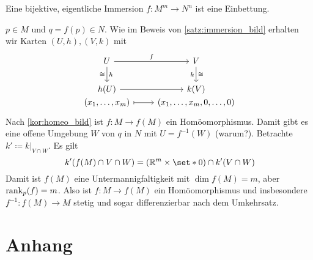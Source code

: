 \begin{satz}
	Eine bijektive, eigentliche Immersion $f \colon M^m \to N^n$ ist eine Einbettung.
\end{satz}
\begin{beweis}
	$p \in M$ und $q =f(p) \in N$.
	Wie im Beweis von \cref{satz:immersion_bild} erhalten wir Karten $(U,h), (V,k)$ mit
	\[
		\begin{tikzcd}
			U \rar["f"] \dar["h","\cong"'] & V \dar["\cong","k"'] \\
			h(U) \rar & k(V) \\[-2em]
			(x_1, \ldots ,x_m) \rar[mapsto] & (x_1, \ldots ,x_m, 0, \ldots ,0)
		\end{tikzcd}
	\]
	Nach \cref{kor:homeo_bild} ist $f \colon M \to f(M)$ ein Homöomorphismus.
	Damit gibt es eine offene Umgebung $W$ von $q$ in $N$ mit $U =f^{-1}(W)$ (warum?).
	Betrachte $k' \coloneqq k|_{V \cap W}$.
	Es gilt 
	\[
		k'(f(M) \cap V \cap W) = (\mathbb{R}^m \times \set*{0}) \cap k'(V \cap W)
	\]
	Damit ist $f(M)$ eine Untermannigfaltigkeit mit $\dim f(M) =m$, aber $\operatorname{rank}_p(f)=m$.
	Also ist $f \colon M \to f(M)$ ein Homöomorphismus und insbesondere $f^{-1} \colon f(M) \to M$ stetig und sogar differenzierbar nach dem Umkehrsatz. 
\end{beweis}



\cleardoubleoddemptypage
{}
\setcounter{page}{1}
\cleardoubleoddemptypage
\appendix

\chapter{Anhang} %
\label{sec:anhang}

\printindex
\printbibliography
\listoffigures
{}
\todototoc

